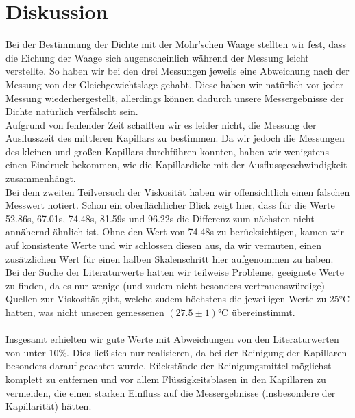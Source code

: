 \documentclass[12pt,a4paper,titlepage,headinclude,bibtotoc]{scrartcl}
\begin{document}
\section{Diskussion}
\label{sec:diskussion}
Bei der Bestimmung der Dichte mit der Mohr'schen Waage stellten wir fest, dass die Eichung der Waage sich augenscheinlich während der Messung leicht verstellte.
So haben wir bei den drei Messungen jeweils eine Abweichung nach der Messung von der Gleichgewichtslage gehabt.
Diese haben wir natürlich vor jeder Messung wiederhergestellt, allerdings können dadurch unsere Messergebnisse der Dichte natürlich verfälscht sein.\\
Aufgrund von fehlender Zeit schafften wir es leider nicht, die Messung der Ausflusszeit des mittleren Kapillars zu bestimmen.
Da wir jedoch die Messungen des kleinen und großen Kapillars durchführen konnten, haben wir wenigstens einen Eindruck bekommen, wie die Kapillardicke mit der Ausflussgeschwindigkeit zusammenhängt.\\
Bei dem zweiten Teilversuch der Viskosität haben wir offensichtlich einen falschen Messwert notiert.
Schon ein oberflächlicher Blick zeigt hier, dass für die Werte 52.86s, 67.01s, 74.48s, 81.59s und 96.22s die Differenz zum nächsten nicht annähernd ähnlich ist.
Ohne den Wert von 74.48s zu berücksichtigen, kamen wir auf konsistente Werte und wir schlossen diesen aus, da wir vermuten, einen zusätzlichen Wert für einen halben Skalenschritt hier aufgenommen zu haben.\\
Bei der Suche der Literaturwerte hatten wir teilweise Probleme, geeignete Werte zu finden, da es nur wenige (und zudem nicht besonders vertrauenswürdige) Quellen zur Viskosität gibt, welche zudem höchstens die jeweiligen Werte zu 25\si{\celsius} hatten, was nicht unseren gemessenen $(27.5\pm 1)$\si{\celsius} übereinstimmt.\\\\
Insgesamt erhielten wir gute Werte mit Abweichungen von den Literaturwerten von unter 10\%.
Dies ließ sich nur realisieren, da bei der Reinigung der Kapillaren besonders darauf geachtet wurde, Rückstände der Reinigungsmittel möglichst komplett zu entfernen und vor allem Flüssigkeitsblasen in den Kapillaren zu vermeiden, die einen starken Einfluss auf die Messergebnisse (insbesondere der Kapillarität) hätten.
\end{document}
